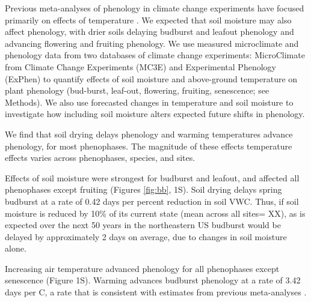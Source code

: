 \documentclass{article}
\begin{document}
\par Previous meta-analyses of phenology in climate change experiments have focused primarily on effects of temperature \citep{wolkovich2012}. We expected that soil moisture may also affect phenology, with drier soils delaying budburst and leafout phenology and advancing flowering and fruiting phenology.  We use measured microclimate and phenology data from two databases of climate change experiments: MicroClimate from Climate Change Experiments (MC3E) and Experimental Phenology (ExPhen)  to quantify effects of soil moisture and above-ground temperature on plant phenology (bud-burst, leaf-out, flowering, fruiting, senescence; see Methods). We also use forecasted changes in temperature and soil moisture to investigate how including soil moisture alters expected future shifts in phenology. 




\par We find that soil drying delays phenology and warming temperatures advance phenology, for most phenophases. The magnitude of these effects temperature effects varies across phenophases, species, and sites. 
\par Effects of soil moisture were strongest for budburst and leafout, and affected all phenophases except fruiting (Figures \ref{fig:bb}, 1S). Soil drying delays spring budburst at a rate of 0.42 days per percent reduction in soil VWC. Thus, if soil moisture is reduced by 
10\% of its current state (mean across all sites= XX), as is expected over the next 50 years in the northeastern US \citep{berg2017} budburst would be delayed by approximately 2 days on average, due to changes in soil moisture alone.

\par  Increasing air temperature advanced phenology for all phenophases except senescence (Figure 1S). Warming advances budburst phenology at a rate of 3.42 days per \degree C, a rate that is consistent with estimates from previous meta-analyses \citep{wolkovich2012}. 

\end{document}
